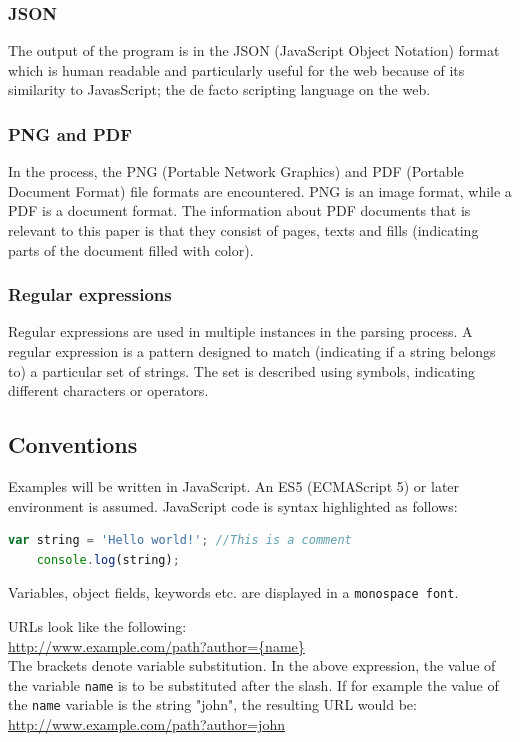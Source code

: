 \documentclass{article}
\begin{document}
	\subsubsection{JSON}
	The output of the program is in the JSON (JavaScript Object Notation) format which is human readable and particularly useful for the web because of its similarity to JavasScript; the de facto scripting language on the web.\cite{wikipedia json}
	
	\subsubsection{PNG and PDF}
	In the process, the PNG (Portable Network Graphics) and PDF (Portable Document Format) file formats are encountered. PNG is an image format, while a PDF is a document format. The information about PDF documents that is relevant to this paper is that they consist of pages, texts and fills (indicating parts of the document filled with color).\cite{wikipedia png}\cite{wikipedia pdf}
	
	\subsubsection{Regular expressions}
	Regular expressions are used in multiple instances in the parsing process. A regular expression is a pattern designed to match (indicating if a string belongs to) a particular set of strings. The set is described using symbols, indicating different characters or operators.\cite{wikipedia regex}
	
	\subsection{Conventions}
	Examples will be written in JavaScript. An ES5 (ECMAScript 5) or later environment is assumed. JavaScript code is syntax highlighted as follows:
	\begin{lstlisting}[language=JavaScript]
	var string = 'Hello world!'; //This is a comment
	console.log(string);
	\end{lstlisting}
	
	Variables, object fields, keywords etc. are displayed in a \texttt{monospace font}.
	
	URLs look like the following:\\
	\url{http://www.example.com/path?author={name}}\\
	The brackets denote variable substitution. In the above expression, the value of the variable \texttt{name} is to be substituted after the slash. If for example the value of the \texttt{name} variable is the string "john", the resulting URL would be:\\
	\url{http://www.example.com/path?author=john}
	
\end{document}
